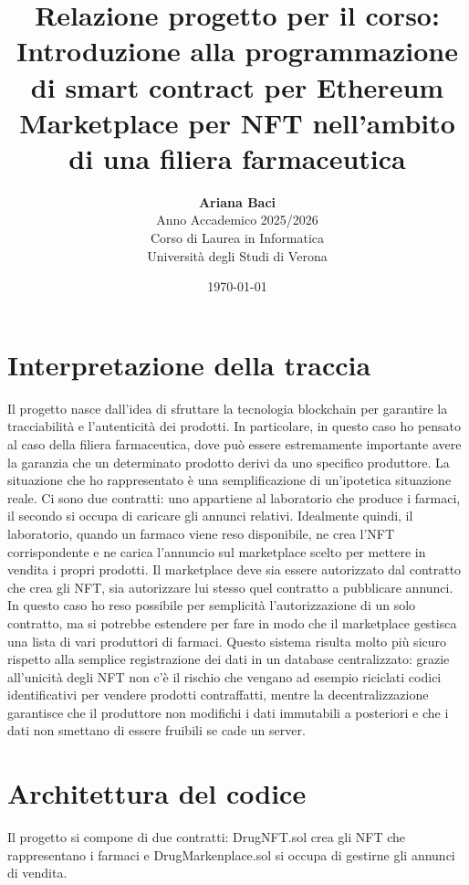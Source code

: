 \documentclass[12pt,a4paper]{article}
\title{
    \large\bfseries Relazione progetto per il corso:  \\[0.6em]
    \large Introduzione alla programmazione di smart contract per Ethereum \\[0.9em]
    \LARGE Marketplace per NFT nell'ambito di una filiera farmaceutica
}
\author{
    \textbf{Ariana Baci} \\[0.8em]
    \small Anno Accademico 2025/2026 \\[0.8em]
    \small Corso di Laurea in Informatica \\
    \small Università degli Studi di Verona
}
\date{\today}
\begin{document}
\maketitle
\newpage
\section{  \Large Interpretazione della traccia }
Il progetto nasce dall'idea di sfruttare la tecnologia blockchain per garantire la tracciabilità e l'autenticità dei prodotti. In particolare, in questo caso ho pensato al caso della filiera farmaceutica, dove può essere estremamente importante avere la garanzia che un
determinato prodotto derivi da uno specifico produttore.
La situazione che ho rappresentato è una semplificazione di un'ipotetica situazione reale.
Ci sono due contratti: uno appartiene al laboratorio che produce i farmaci, il secondo
si occupa di caricare gli annunci relativi. Idealmente quindi, il laboratorio, quando un farmaco viene reso disponibile, ne crea l'NFT corrispondente
e ne carica l'annuncio sul marketplace scelto per mettere in vendita i propri prodotti.
Il marketplace deve sia essere autorizzato dal contratto che crea gli NFT, sia autorizzare lui stesso quel contratto a pubblicare annunci. In questo caso
ho reso possibile per semplicità l'autorizzazione di un solo contratto, ma si potrebbe estendere per fare in modo che il marketplace gestisca 
una lista di vari produttori di farmaci. \newline Questo sistema risulta molto più sicuro rispetto 
alla semplice registrazione dei dati in un database centralizzato: grazie all'unicità degli NFT non c'è il rischio che vengano ad esempio riciclati codici identificativi per vendere prodotti contraffatti, mentre la decentralizzazione garantisce
che il produttore non modifichi i dati immutabili a posteriori e che i dati non smettano di essere fruibili se cade un server.
\section{  \Large Architettura del codice}
Il progetto si compone di due contratti: DrugNFT.sol crea gli NFT che rappresentano i farmaci
e DrugMarkenplace.sol si occupa di gestirne gli annunci di vendita.
\end{document}
